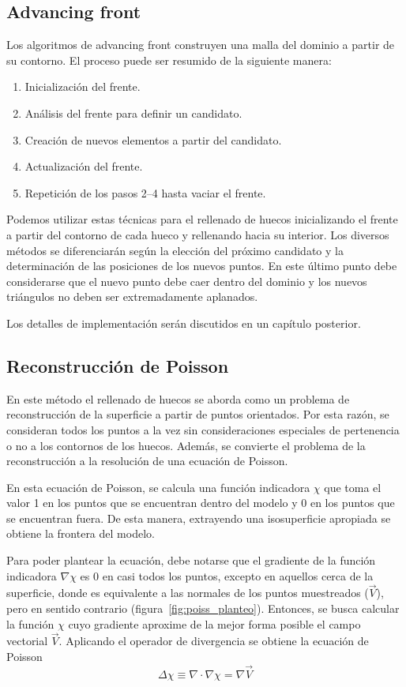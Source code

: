 \subsection{Advancing front}
Los algoritmos de advancing front construyen una malla del dominio a partir de su contorno.
El proceso puede ser resumido de la siguiente manera:
\begin{enumerate}
	\item Inicialización del frente.
	\item Análisis del frente para definir un candidato.
	\item Creación de nuevos elementos a partir del candidato.
	\item Actualización del frente.
	\item Repetición de los pasos 2--4 hasta vaciar el frente.
\end{enumerate}

Podemos utilizar estas técnicas para el rellenado de huecos
inicializando el frente a partir del contorno de cada hueco
y rellenando hacia su interior.
Los diversos métodos se diferenciarán según la elección del próximo candidato
y la determinación de las posiciones de los nuevos puntos.
En este último punto debe considerarse que el nuevo punto debe caer dentro del dominio y
los nuevos triángulos no deben ser extremadamente aplanados.

Los detalles de implementación serán discutidos en un capítulo posterior.

\subsection{Reconstrucción de Poisson}
En este método el rellenado de huecos se aborda como un problema de
reconstrucción de la superficie a partir de puntos orientados.  Por esta
razón, se consideran todos los puntos a la vez sin consideraciones
especiales de pertenencia o no a los contornos de los huecos.
Además, se convierte el problema de la reconstrucción a la resolución de
una ecuación de Poisson.

En esta ecuación de Poisson, se calcula una función indicadora $\chi$
que toma el valor 1 en los puntos que se encuentran dentro del modelo
y 0 en los puntos que se encuentran fuera.
De esta manera, extrayendo una isosuperficie apropiada se obtiene la frontera del modelo.

Para poder plantear la ecuación, debe notarse que el gradiente de la función indicadora $\nabla \chi$
es 0 en casi todos los puntos, excepto en aquellos cerca de la superficie,
donde es equivalente a las normales de los puntos muestreados ($\vec{V}$), pero en sentido contrario (figura~\ref{fig:poiss_planteo}).
Entonces, se busca calcular la función $\chi$ cuyo gradiente aproxime de la mejor forma posible el
campo vectorial $\vec{V}$.
Aplicando  el operador de divergencia se obtiene la ecuación de Poisson
\[ \Delta\chi \equiv \nabla \cdot \nabla \chi = \nabla\vec{V} \]

